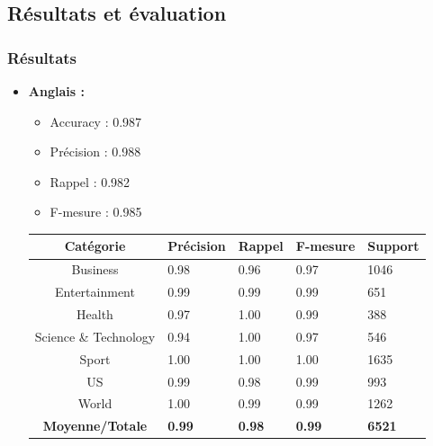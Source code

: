     \subsection{Résultats et évaluation}
        \subsubsection{Résultats}
        \begin{itemize}
            \item{\textbf{Anglais :}}
            \begin{itemize}
                \item{Accuracy : 0.987}
                \item{Précision : 0.988}
                \item{Rappel : 0.982}
                \item{F-mesure : 0.985}
            \end{itemize}
            \begin{table}[H]
                    \begin{center}
                        \begin{tabular}{|c|C{2cm}|C{2cm}|C{2cm}|C{2cm}|}
                            \hline
                            \textbf{Catégorie} &  \textbf{Précision} &  \textbf{Rappel} &  \textbf{F-mesure} &  \textbf{Support} \\
                            \hline
                            Business & 0.98 & 0.96 & 0.97 & 1046 \\
                            Entertainment & 0.99 & 0.99 & 0.99 & 651 \\
                            Health & 0.97 & 1.00 & 0.99 & 388 \\
                            Science \& Technology & 0.94 & 1.00 & 0.97 & 546 \\
                            Sport & 1.00 & 1.00 & 1.00 & 1635 \\
                            US & 0.99 & 0.98 & 0.99 & 993 \\
                            World & 1.00 & 0.99 & 0.99 & 1262 \\                          
                            \textbf{Moyenne/Totale} & \textbf{0.99} & \textbf{0.98} & \textbf{0.99} & \textbf{6521} \\
                            \hline
                        \end{tabular}
                    \end{center}

\end{table}
\end{itemize}

